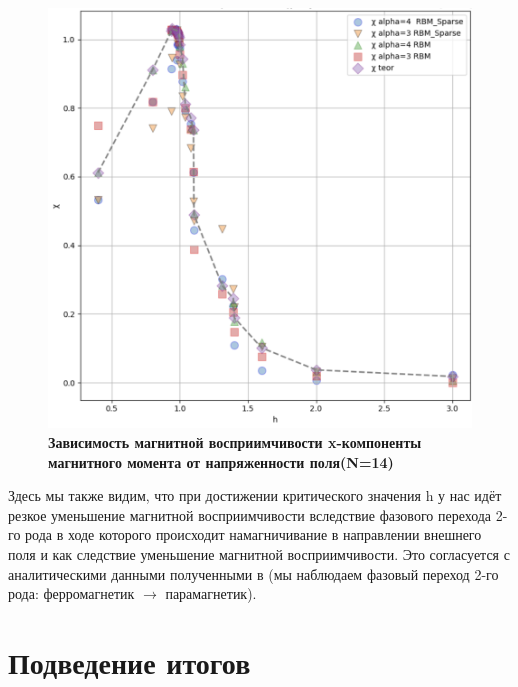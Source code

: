 \begin{figure}[H]
    \centering
    \includegraphics[width=1\linewidth]{Course_work/Images/MV-N-14.png}
    \caption{\textbf{Зависимость магнитной восприимчивости x-компоненты магнитного момента  от напряженности поля(N=14)}}
    \label{fig:e11}
\end{figure}

Здесь мы также видим, что при достижении критического значения h у нас идёт резкое уменьшение магнитной восприимчивости вследствие фазового перехода 2-го рода в ходе которого происходит намагничивание в направлении внешнего поля и как следствие уменьшение магнитной восприимчивости. Это согласуется с  аналитическими данными полученными в \cite{gomes2024} (мы наблюдаем  фазовый переход 2-го рода: ферромагнетик \(\rightarrow\)  парамагнетик).

\section{Подведение итогов}

